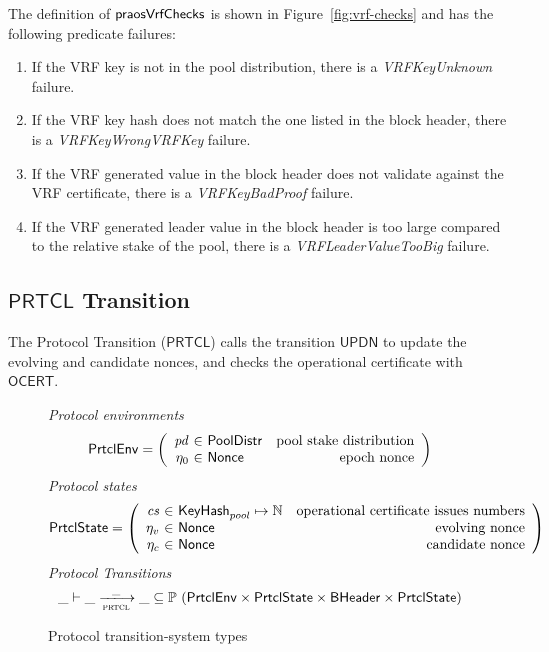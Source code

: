 The definition of $\mathsf{praosVrfChecks}$ is shown in Figure~\ref{fig:vrf-checks}
and has the following predicate failures:

\begin{enumerate}
\item \label{itm:vrf-failures-1} If the VRF key is not in the pool distribution, there is a
  \emph{VRFKeyUnknown} failure.
\item \label{itm:vrf-failures-2} If the VRF key hash does not match the one listed in the block header,
  there is a \emph{VRFKeyWrongVRFKey} failure.
\item \label{itm:vrf-failures-3} If the VRF generated value in the block header does not validate
  against the VRF certificate, there is a \emph{VRFKeyBadProof} failure.
\item \label{itm:vrf-failures-4} If the VRF generated leader value in the block header is too large
  compared to the relative stake of the pool, there is a \emph{VRFLeaderValueTooBig} failure.
\end{enumerate}

\clearpage

\subsection{$\mathsf{PRTCL}$ Transition}
\label{sec:protocol-trans}

The Protocol Transition ($\mathsf{PRTCL}$) calls the transition $\mathsf{UPDN}$ to update the evolving
and candidate nonces, and checks the operational certificate with $\mathsf{OCERT}$.

\begin{figure}
  \emph{Protocol environments}
  \begin{equation*}
    \PrtclEnv =
    \left(
      \begin{array}{r@{~\in~}lr}
        \var{pd} & \PoolDistr & \text{pool stake distribution} \\
        \eta_0 & \Nonce & \text{epoch nonce} \\
      \end{array}
    \right)
  \end{equation*}
  \emph{Protocol states}
  \begin{equation*}
    \PrtclState =
    \left(
      \begin{array}{r@{~\in~}lr}
        \var{cs} & \KeyHash_{pool} \mapsto \N & \text{operational certificate issues numbers} \\
        \eta_v & \Nonce & \text{evolving nonce} \\
        \eta_c & \Nonce & \text{candidate nonce} \\
      \end{array}
    \right)
  \end{equation*}
  \emph{Protocol Transitions}
  \begin{equation*}
    \_ \vdash \var{\_} \trans{prtcl}{\_} \var{\_} \subseteq
    \powerset (\PrtclEnv \times \PrtclState \times \BHeader \times \PrtclState)
  \end{equation*}
  \caption{Protocol transition-system types}
  \label{fig:ts-types:prtcl}
\end{figure}

